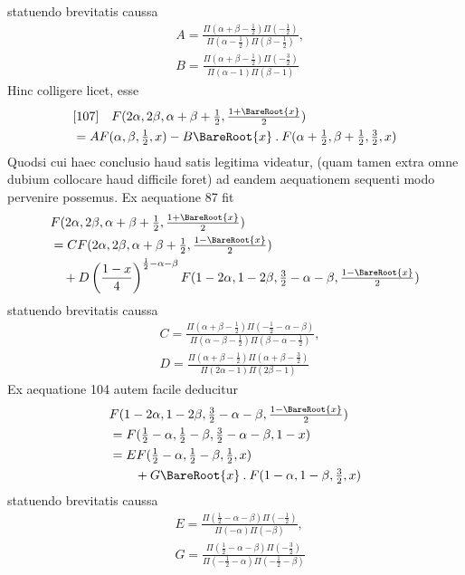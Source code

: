 statuendo brevitatis caussa
\[
\begin{aligned}&A=\frac{\Pi(\alpha+\beta-\tfrac12)\Pi(-\tfrac12)}{\Pi(\alpha-\tfrac12)\Pi(\beta-\tfrac12)},\\&
B=\frac{\Pi(\alpha+\beta-\tfrac12)\Pi(-\tfrac32)}{\Pi(\alpha-1)\Pi(\beta-1)}\end{aligned}
\]
Hinc colligere licet, esse
\[
\begin{aligned}&[107]\quad F(2\alpha,2\beta,\alpha+\beta+\tfrac12,\tfrac{1+\BareRoot{x}}2)\\&=AF(\alpha,\beta,\tfrac12,x)-B\BareRoot{x}\mathbin{.}F(\alpha+\tfrac12,\beta+\tfrac12,\tfrac32,x)\end{aligned}
\]
Quodsi cui haec conclusio haud satis legitima videatur, (quam tamen extra
omne dubium collocare haud difficile foret) ad eandem aequationem sequenti modo
pervenire possemus. Ex aequatione 87 fit
\[
\begin{aligned}
&F(2\alpha,2\beta,\alpha+\beta+\tfrac12,\tfrac{1+\BareRoot{x}}2)\\&=CF(2\alpha,2\beta,\alpha+\beta+\tfrac12,\tfrac{1-\BareRoot{x}}2)\\
&\quad+D\left(\frac{1-x}4\right)^{\frac12-\alpha-\beta}F(1-2\alpha,1-2\beta,\tfrac32-\alpha-\beta,\tfrac{1-\BareRoot{x}}2)
\end{aligned}
\]
statuendo brevitatis caussa
\[
\begin{aligned}&C=\frac{\Pi(\alpha+\beta-\tfrac12)\Pi(-\tfrac12-\alpha-\beta)}{\Pi(\alpha-\beta-\tfrac12)\Pi(\beta-\alpha-\tfrac12)},\\&
D=\frac{\Pi(\alpha+\beta-\tfrac12)\Pi(\alpha+\beta-\tfrac32)}{\Pi(2\alpha-1)\Pi(2\beta-1)}\end{aligned}
\]
Ex aequatione 104 autem facile deducitur
\[
\begin{aligned}
&F(1-2\alpha,1-2\beta,\tfrac32-\alpha-\beta,\tfrac{1-\BareRoot{x}}2)\\&=F(\tfrac12-\alpha,\tfrac12-\beta,\tfrac32-\alpha-\beta,1-x)\\
&=EF(\tfrac12-\alpha,\tfrac12-\beta,\tfrac12,x)\\&\qquad+G\BareRoot{x}\mathbin{.}F(1-\alpha,1-\beta,\tfrac32,x)
\end{aligned}
\]
statuendo brevitatis caussa
\[
\begin{aligned}&E=\frac{\Pi(\tfrac12-\alpha-\beta)\Pi(-\tfrac12)}{\Pi(-\alpha)\Pi(-\beta)},\\&
G=\frac{\Pi(\tfrac12-\alpha-\beta)\Pi(-\tfrac32)}{\Pi(-\tfrac12-\alpha)\Pi(-\tfrac12-\beta)}\end{aligned}
\]
